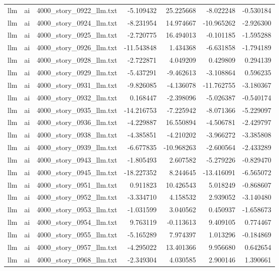 \begin{longtable}{lllrrrr}
llm & ai & 4000\_story\_0922\_llm.txt & -5.109432 & 25.225668 & -8.022248 & -0.530184 \\
llm & ai & 4000\_story\_0924\_llm.txt & -8.231954 & 14.974667 & -10.965262 & -2.926300 \\
llm & ai & 4000\_story\_0925\_llm.txt & -2.720775 & 16.494013 & -0.101185 & -1.595288 \\
llm & ai & 4000\_story\_0926\_llm.txt & -11.543848 & 1.434368 & -6.631858 & -1.794189 \\
llm & ai & 4000\_story\_0928\_llm.txt & -2.722871 & 4.049209 & 0.429809 & 0.294139 \\
llm & ai & 4000\_story\_0929\_llm.txt & -5.437291 & -9.462613 & -3.108864 & 0.596235 \\
llm & ai & 4000\_story\_0931\_llm.txt & -9.826085 & -4.136078 & -11.762755 & -3.180367 \\
llm & ai & 4000\_story\_0932\_llm.txt & 0.168447 & -2.398096 & -5.026387 & -0.540174 \\
llm & ai & 4000\_story\_0935\_llm.txt & -14.216753 & -7.225942 & -8.071366 & -5.229097 \\
llm & ai & 4000\_story\_0936\_llm.txt & -4.229887 & 16.550894 & -4.506781 & -2.429797 \\
llm & ai & 4000\_story\_0938\_llm.txt & -4.385851 & -4.210202 & -3.966272 & -3.385808 \\
llm & ai & 4000\_story\_0939\_llm.txt & -6.677835 & -10.968263 & -2.600564 & -2.433289 \\
llm & ai & 4000\_story\_0943\_llm.txt & -1.805493 & 2.607582 & -5.279226 & -0.829470 \\
llm & ai & 4000\_story\_0945\_llm.txt & -18.227352 & 8.244645 & -13.416091 & -6.565072 \\
llm & ai & 4000\_story\_0951\_llm.txt & 0.911823 & 10.426543 & 5.018249 & -0.868607 \\
llm & ai & 4000\_story\_0952\_llm.txt & -3.334710 & 4.158532 & 2.939052 & -3.140480 \\
llm & ai & 4000\_story\_0953\_llm.txt & -1.031599 & 3.040562 & 0.450937 & -1.658673 \\
llm & ai & 4000\_story\_0954\_llm.txt & 9.763119 & -0.113613 & 9.409105 & 0.774467 \\
llm & ai & 4000\_story\_0955\_llm.txt & -5.165289 & 7.974397 & 1.013296 & -0.184869 \\
llm & ai & 4000\_story\_0957\_llm.txt & -4.295022 & 13.401366 & 9.956680 & 0.642654 \\
llm & ai & 4000\_story\_0968\_llm.txt & -2.349304 & 4.030585 & 2.900146 & 1.390661 \\

\end{longtable}
